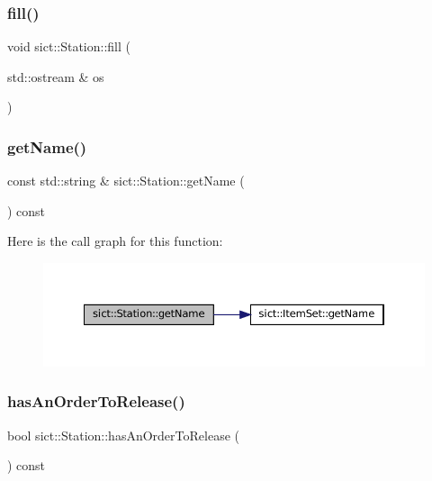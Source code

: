 \subsubsection{\texorpdfstring{fill()}{fill()}}
{\footnotesize\ttfamily void sict\+::\+Station\+::fill (\begin{DoxyParamCaption}\item[{std\+::ostream \&}]{os }\end{DoxyParamCaption})}

\mbox{\label{classsict_1_1Station_aa35cfe52f0f33ef1399f6b4b6f5ed91f}} 
\subsubsection{\texorpdfstring{getName()}{getName()}}
{\footnotesize\ttfamily const std\+::string \& sict\+::\+Station\+::get\+Name (\begin{DoxyParamCaption}{ }\end{DoxyParamCaption}) const}

Here is the call graph for this function\+:
\nopagebreak
\begin{figure}[H]
\begin{center}
\leavevmode
\includegraphics[width=350pt]{classsict_1_1Station_aa35cfe52f0f33ef1399f6b4b6f5ed91f_cgraph}
\end{center}
\end{figure}
\mbox{\label{classsict_1_1Station_a9e892b3c93dd2163d1c6569dba6c8536}} 
\subsubsection{\texorpdfstring{hasAnOrderToRelease()}{hasAnOrderToRelease()}}
{\footnotesize\ttfamily bool sict\+::\+Station\+::has\+An\+Order\+To\+Release (\begin{DoxyParamCaption}{ }\end{DoxyParamCaption}) const}

